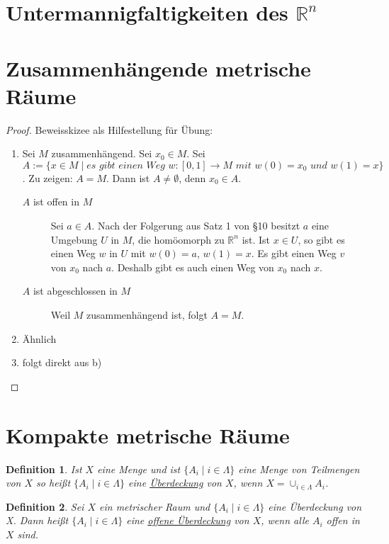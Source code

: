 \documentclass[10pt,a4paper]{report}
\newtheorem*{defi}{Definition}
\begin{document}
\section{Untermannigfaltigkeiten des $\mathbb{R}^{n}$}

\section{Zusammenhängende metrische Räume}

\begin{proof}
  Beweisskizee als Hilfestellung für Übung:
  \begin{enumerate}[label={\alph*)}]
  \item Sei $M$ zusammenhängend.
    Sei $x_{0} \in M$.
    Sei $A := \{ x \in M \mid \textit{es gibt einen Weg $w : [0, 1] \rightarrow M$ mit $w(0) = x_0$ und $w(1) = x$} \}$.
    Zu zeigen: $A = M$.
    Dann ist $A \ne \emptyset$, denn $x_{0} \in A$.
    \begin{description}
    \item[$A$ ist offen in $M$] Sei $a \in A$.
      Nach der Folgerung aus Satz 1 von §10 besitzt $a$ eine Umgebung $U$ in $M$, die homöomorph zu $\mathbb{R}^{n}$ ist.
      Ist $x \in U$, so gibt es einen Weg $w$ in $U$ mit $w(0) = a$, $w(1) = x$.
      Es gibt einen Weg $v$ von $x_{0}$ nach $a$.
      Deshalb gibt es auch einen Weg von $x_{0}$ nach $x$.
      \item[$A$ ist abgeschlossen in $M$] Weil $M$ zusammenhängend ist, folgt $A = M$.
    \end{description}
  \item Ähnlich
  \item folgt direkt aus b)
  \end{enumerate}
\end{proof}

\section{Kompakte metrische Räume}

\begin{defi}
  Ist $X$ eine Menge und ist $\{ A_{i} \mid i \in \Lambda \}$ eine Menge von Teilmengen von $X$ so heißt $\{ A_{i} \mid i \in \Lambda \}$ eine \underline{Überdeckung} von $X$, wenn $X = \cup_{i \in \Lambda} A_{i}$.
\end{defi}

\begin{defi}
  Sei $X$ ein metrischer Raum und $\{ A_{i} \mid i \in \Lambda \}$ eine Überdeckung von X.
  Dann heißt $\{ A_{i} \mid i \in \Lambda \}$ eine \underline{offene Überdeckung} von $X$, wenn alle $A_{i}$ offen in $X$ sind.
\end{defi}
\end{document}

